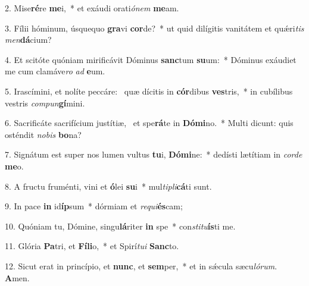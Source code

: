 2. Mise\textbf{ré}re \textbf{me}i,~*  et exáudi orati\textit{ó}\textit{nem} \textbf{me}am.\

3. Fílii hóminum, úsquequo \textbf{gra}vi \textbf{cor}de?~*  ut quid dilígitis vanitátem et quǽri\textit{tis} \textit{men}\textbf{dá}cium?\

4. Et scitóte quóniam mirificávit Dóminus \textbf{sanc}tum \textbf{su}um:~*  Dóminus exáudiet me cum clamáve\textit{ro} \textit{ad} \textbf{e}um.\

5. Irascímini, et nolíte peccáre: \dag\  quæ dícitis in \textbf{cór}dibus \textbf{ves}tris,~*  in cubílibus vestris \textit{com}\textit{pun}\textbf{gí}mini.\

6. Sacrificáte sacrifícium justítiæ, \dag\  et spe\textbf{rá}te in \textbf{Dó}\textbf{mi}no.~*  Multi dicunt: quis osténdit \textit{no}\textit{bis} \textbf{bo}na?\

7. Signátum est super nos lumen vultus \textbf{tu}i, \textbf{Dó}\textbf{mi}ne:~*  dedísti lætítiam in \textit{cor}\textit{de} \textbf{me}o.\

8. A fructu fruménti, vini et \textbf{ó}lei \textbf{su}i~*  mul\textit{ti}\textit{pli}\textbf{cá}ti sunt.\

9. In pace \textbf{in} id\textbf{íp}sum~*  dórmiam et \textit{re}\textit{qui}\textbf{és}cam;\

10. Quóniam tu, Dómine, singu\textbf{lá}riter \textbf{in} spe~*  con\textit{sti}\textit{tu}\textbf{ís}ti me.\

11. Glória \textbf{Pa}tri, et \textbf{Fí}\textbf{li}o,~*  et Spirí\textit{tu}\textit{i} \textbf{Sanc}to.\

12. Sicut erat in princípio, et \textbf{nunc}, et \textbf{sem}per,~*  et in sǽcula sæcu\textit{ló}\textit{rum}. \textbf{A}men.\

